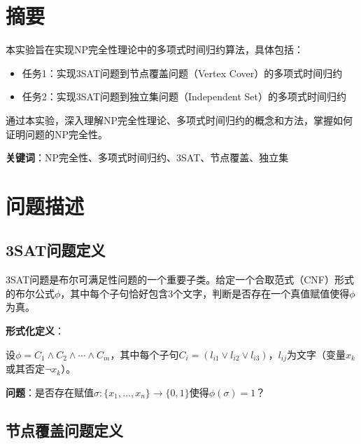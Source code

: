 \documentclass{sysucseexp}
\begin{document}
\makecover
\tableofcontents
\cleardoublepage
\pagestyle{main}


\section{摘要}

本实验旨在实现NP完全性理论中的多项式时间归约算法，具体包括：

\begin{itemize}
    \item 任务1：实现3SAT问题到节点覆盖问题（Vertex Cover）的多项式时间归约
    \item 任务2：实现3SAT问题到独立集问题（Independent Set）的多项式时间归约
\end{itemize}

通过本实验，深入理解NP完全性理论、多项式时间归约的概念和方法，掌握如何证明问题的NP完全性。

\vspace{1em}
\textbf{关键词}：NP完全性、多项式时间归约、3SAT、节点覆盖、独立集


\section{问题描述}

\subsection{3SAT问题定义}

3SAT问题是布尔可满足性问题的一个重要子类。给定一个合取范式（CNF）形式的布尔公式$\phi$，其中每个子句恰好包含3个文字，判断是否存在一个真值赋值使得$\phi$为真。

\textbf{形式化定义}：

设$\phi = C_1 \land C_2 \land \cdots \land C_m$，其中每个子句$C_i = (l_{i1} \lor l_{i2} \lor l_{i3})$，$l_{ij}$为文字（变量$x_k$或其否定$\neg x_k$）。

\textbf{问题}：是否存在赋值$\sigma: \{x_1, \ldots, x_n\} \to \{0, 1\}$使得$\phi(\sigma) = 1$？

\subsection{节点覆盖问题定义}
\end{document}
